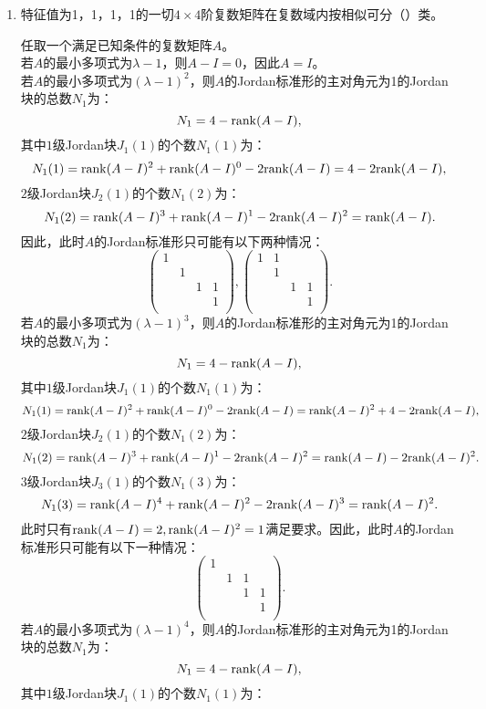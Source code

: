 \begin{enumerate}[1~]
\begin{enumerate}[1.~]
\item
特征值为1，1，1，1的一切$4\times4$阶复数矩阵在复数域内按相似可分（\quad）类。
\begin{solution}
任取一个满足已知条件的复数矩阵$A$。\\
若$A$的最小多项式为$\lambda-1$，则$A-I=0$，因此$A=I$。\\
若$A$的最小多项式为$(\lambda-1)^2$，则$A$的Jordan标准形的主对角元为1的Jordan块的总数$N_1$为：\[
N_1=4-{\rm rank}(A-I),
\]
其中$1$级Jordan块$J_1(1)$的个数$N_1(1)$为：\[
N_1(1)={\rm rank}(A-I)^2+{\rm rank}(A-I)^0-2{\rm rank}(A-I)=4-2{\rm rank}(A-I),
\]
$2$级Jordan块$J_2(1)$的个数$N_1(2)$为：\[
N_1(2)={\rm rank}(A-I)^3+{\rm rank}(A-I)^1-2{\rm rank}(A-I)^2={\rm rank}(A-I).
\]
因此，此时$A$的Jordan标准形只可能有以下两种情况：\[
\left( \begin{matrix}
	1&		&		&		\\
	&		1&		&		\\
	&		&		1&		1\\
	&		&		&		1\\
\end{matrix} \right) ,\left( \begin{matrix}
	1&		1&		&		\\
	&		1&		&		\\
	&		&		1&		1\\
	&		&		&		1\\
\end{matrix} \right) .
\]
若$A$的最小多项式为$(\lambda-1)^3$，则$A$的Jordan标准形的主对角元为1的Jordan块的总数$N_1$为：\[
N_1=4-{\rm rank}(A-I),
\]
其中$1$级Jordan块$J_1(1)$的个数$N_1(1)$为：\[
N_1(1)={\rm rank}(A-I)^2+{\rm rank}(A-I)^0-2{\rm rank}(A-I)={\rm rank}(A-I)^2+4-2{\rm rank}(A-I),
\]
$2$级Jordan块$J_2(1)$的个数$N_1(2)$为：\[
N_1(2)={\rm rank}(A-I)^3+{\rm rank}(A-I)^1-2{\rm rank}(A-I)^2={\rm rank}(A-I)-2{\rm rank}(A-I)^2.
\]
$3$级Jordan块$J_3(1)$的个数$N_1(3)$为：\[
N_1(3)={\rm rank}(A-I)^4+{\rm rank}(A-I)^2-2{\rm rank}(A-I)^3={\rm rank}(A-I)^2.
\]
此时只有${\rm rank}(A-I)=2, {\rm rank}(A-I)^2=1$满足要求。因此，此时$A$的Jordan标准形只可能有以下一种情况：\[
\left( \begin{matrix}
	1&		&		&		\\
	&		1&		1&		\\
	&		&		1&		1\\
	&		&		&		1\\
\end{matrix} \right) .
\]
若$A$的最小多项式为$(\lambda-1)^4$，则$A$的Jordan标准形的主对角元为1的Jordan块的总数$N_1$为：\[
N_1=4-{\rm rank}(A-I),
\]
其中$1$级Jordan块$J_1(1)$的个数$N_1(1)$为：\[
\]
\end{solution}
\end{enumerate}
\end{enumerate}
